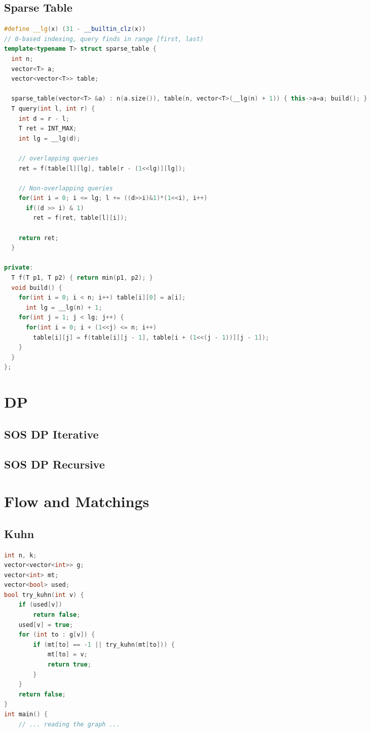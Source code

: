\documentclass[10pt,a4paper,landscape]{article}
\begin{document}
\begin{multicols}{3}
\subsection{Sparse Table}
\begin{lstlisting}[language=C++, breaklines=true]
#define __lg(x) (31 - __builtin_clz(x))
// 0-based indexing, query finds in range [first, last)
template<typename T> struct sparse_table {
  int n;
  vector<T> a;
  vector<vector<T>> table;

  sparse_table(vector<T> &a) : n(a.size()), table(n, vector<T>(__lg(n) + 1)) { this->a=a; build(); }
  T query(int l, int r) {
    int d = r - l;
    T ret = INT_MAX;
    int lg = __lg(d);

    // overlapping queries
    ret = f(table[l][lg], table[r - (1<<lg)][lg]);

    // Non-overlapping queries
    for(int i = 0; i <= lg; l += ((d>>i)&1)*(1<<i), i++)
      if((d >> i) & 1)
        ret = f(ret, table[l][i]);
    
    return ret;
  }

private:
  T f(T p1, T p2) { return min(p1, p2); }
  void build() {
    for(int i = 0; i < n; i++) table[i][0] = a[i];
      int lg = __lg(n) + 1;
    for(int j = 1; j < lg; j++) {
      for(int i = 0; i + (1<<j) <= n; i++)
        table[i][j] = f(table[i][j - 1], table[i + (1<<(j - 1))][j - 1]);
    }
  }
};
\end{lstlisting}

\section{DP}

\subsection{SOS DP Iterative}

\subsection{SOS DP Recursive}

\section{Flow and Matchings}

\subsection{Kuhn}
\begin{lstlisting}[language=C++, breaklines=true]
int n, k;
vector<vector<int>> g;
vector<int> mt;
vector<bool> used;
bool try_kuhn(int v) {
    if (used[v])
        return false;
    used[v] = true;
    for (int to : g[v]) {
        if (mt[to] == -1 || try_kuhn(mt[to])) {
            mt[to] = v;
            return true;
        }
    }
    return false;
}
int main() {
    // ... reading the graph ...


\end{lstlisting}
\end{multicols}
\end{document}
